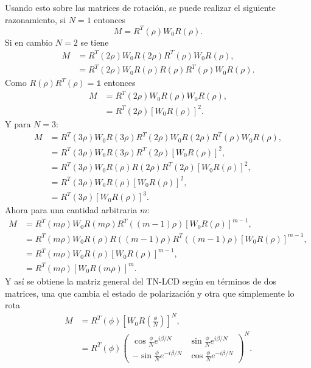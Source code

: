 Usando esto sobre las matrices de rotación, se puede realizar el
siguiente razonamiento, si $N=1$ entonces
\begin{equation*}
  M = R^T(\rho)W_0R(\rho).
\end{equation*}
Si en cambio $N=2$ se tiene
\begin{align*}
  M &= R^T(2\rho)W_0R(2\rho)R^T(\rho)W_0R(\rho),\\
      &=R^T(2\rho)W_0R(\rho)R(\rho)R^T(\rho)W_0R(\rho).
\end{align*}
Como $R(\rho)R^T(\rho)=\mathds{1}$ entonces
\begin{align*}
 M &= R^T(2\rho)W_0R(\rho)W_0R(\rho),\\
     &=R^T(2\rho)\left[W_0R(\rho)\right]^2.
\end{align*}
Y para $N=3$:
\begin{align*}
  M &= R^T(3\rho)W_0R(3\rho)R^T(2\rho)W_0R(2\rho)R^T(\rho)W_0R(\rho),\\
      &=R^T(3\rho)W_0R(3\rho)R^T(2\rho)\left[W_0R(\rho)\right]^2,\\
      &=R^T(3\rho)W_0R(\rho)R(2\rho)R^T(2\rho)\left[W_0R(\rho)\right]^2,\\
      &=R^T(3\rho)W_0R(\rho)\left[W_0R(\rho)\right]^2,\\
      &=R^T(3\rho)\left[W_0R(\rho)\right]^3.
\end{align*}
Ahora para una cantidad arbitraria $m$:
\begin{align*}
  M &= R^T(m\rho)W_0R(m\rho)R^T((m-1)\rho)\left[W_0R(\rho)\right]^{m-1},\\
      &=R^T(m\rho)W_0R(\rho)R((m-1)\rho)R^T((m-1)\rho)\left[W_0R(\rho)\right]^{m-1},\\  
      &=R^T(m\rho)W_0R(\rho)\left[W_0R(\rho)\right]^{m-1},\\
      &=R^T(m\rho)\left[W_0R(m\rho)\right]^{m}.
\end{align*}
Y así se obtiene la matriz general del TN-LCD según  en
términos de dos matrices, una que cambia el estado de polarización y
otra que simplemente lo rota
\begin{align}
M&=R^T\left( \phi\right)
\left[W_0R\left(\frac{\phi}{N}\right)\right]^N,\\
&=R^T\left( \phi\right)
\begin{pmatrix}
  \cos{\frac{\phi}{N}e^{i\beta/N}} &  \sin{\frac{\phi}{N}e^{i\beta/N}}\\
  -\sin{\frac{\phi}{N}e^{-i\beta/N}} &  \cos{\frac{\phi}{N}e^{-i\beta/N}}  
\end{pmatrix}^N.
\label{eq:general_lcd_matrix}
\end{align}
